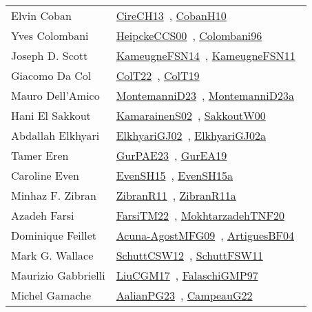 {\begin{longtable}{p{4cm}p{20cm}}
Elvin Coban & \href{works/CireCH13.pdf}{CireCH13}~\cite{CireCH13}, \href{works/CobanH10.pdf}{CobanH10}~\cite{CobanH10}\\
Yves Colombani & \href{works/HeipckeCCS00.pdf}{HeipckeCCS00}~\cite{HeipckeCCS00}, \href{works/Colombani96.pdf}{Colombani96}~\cite{Colombani96}\\
Joseph D. Scott & \href{works/KameugneFSN14.pdf}{KameugneFSN14}~\cite{KameugneFSN14}, \href{works/KameugneFSN11.pdf}{KameugneFSN11}~\cite{KameugneFSN11}\\
Giacomo Da Col & \href{works/ColT22.pdf}{ColT22}~\cite{ColT22}, \href{works/ColT19.pdf}{ColT19}~\cite{ColT19}\\
Mauro Dell'Amico & \href{works/MontemanniD23.pdf}{MontemanniD23}~\cite{MontemanniD23}, \href{works/MontemanniD23a.pdf}{MontemanniD23a}~\cite{MontemanniD23a}\\
Hani El Sakkout & \href{works/KamarainenS02.pdf}{KamarainenS02}~\cite{KamarainenS02}, \href{works/SakkoutW00.pdf}{SakkoutW00}~\cite{SakkoutW00}\\
Abdallah Elkhyari & \href{works/ElkhyariGJ02.pdf}{ElkhyariGJ02}~\cite{ElkhyariGJ02}, \href{works/ElkhyariGJ02a.pdf}{ElkhyariGJ02a}~\cite{ElkhyariGJ02a}\\
Tamer Eren & \href{works/GurPAE23.pdf}{GurPAE23}~\cite{GurPAE23}, \href{works/GurEA19.pdf}{GurEA19}~\cite{GurEA19}\\
Caroline Even & \href{works/EvenSH15.pdf}{EvenSH15}~\cite{EvenSH15}, \href{works/EvenSH15a.pdf}{EvenSH15a}~\cite{EvenSH15a}\\
Minhaz F. Zibran & \href{works/ZibranR11.pdf}{ZibranR11}~\cite{ZibranR11}, \href{works/ZibranR11a.pdf}{ZibranR11a}~\cite{ZibranR11a}\\
Azadeh Farsi & \href{}{FarsiTM22}~\cite{FarsiTM22}, \href{works/MokhtarzadehTNF20.pdf}{MokhtarzadehTNF20}~\cite{MokhtarzadehTNF20}\\
Dominique Feillet & \href{works/Acuna-AgostMFG09.pdf}{Acuna-AgostMFG09}~\cite{Acuna-AgostMFG09}, \href{works/ArtiguesBF04.pdf}{ArtiguesBF04}~\cite{ArtiguesBF04}\\
Mark G. Wallace & \href{works/SchuttCSW12.pdf}{SchuttCSW12}~\cite{SchuttCSW12}, \href{works/SchuttFSW11.pdf}{SchuttFSW11}~\cite{SchuttFSW11}\\
Maurizio Gabbrielli & \href{works/LiuCGM17.pdf}{LiuCGM17}~\cite{LiuCGM17}, \href{works/FalaschiGMP97.pdf}{FalaschiGMP97}~\cite{FalaschiGMP97}\\
Michel Gamache & \href{works/AalianPG23.pdf}{AalianPG23}~\cite{AalianPG23}, \href{works/CampeauG22.pdf}{CampeauG22}~\cite{CampeauG22}\\

\end{longtable}}
